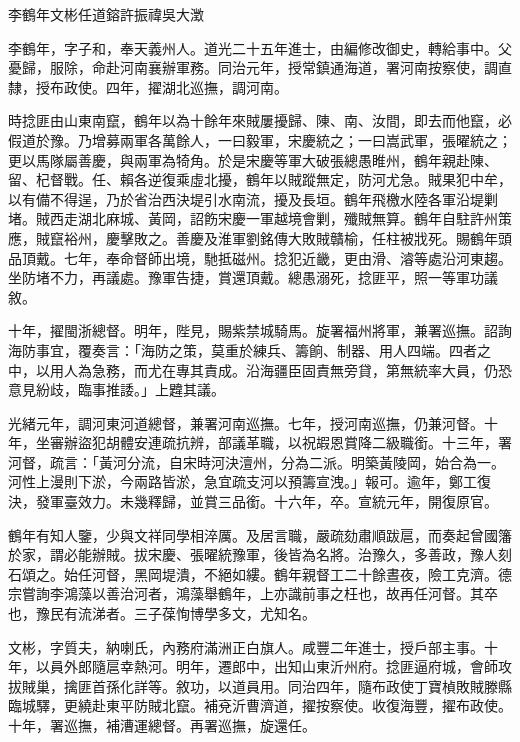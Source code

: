 
\begin{pinyinscope}
李鶴年文彬任道鎔許振禕吳大澂

李鶴年，字子和，奉天義州人。道光二十五年進士，由編修改御史，轉給事中。父憂歸，服除，命赴河南襄辦軍務。同治元年，授常鎮通海道，署河南按察使，調直隸，授布政使。四年，擢湖北巡撫，調河南。

時捻匪由山東南竄，鶴年以為十餘年來賊屢擾歸、陳、南、汝間，即去而他竄，必假道於豫。乃增募兩軍各萬餘人，一曰毅軍，宋慶統之；一曰嵩武軍，張曜統之；更以馬隊屬善慶，與兩軍為犄角。於是宋慶等軍大破張總愚睢州，鶴年親赴陳、留、杞督戰。任、賴各逆復乘虛北擾，鶴年以賊蹤無定，防河尤急。賊果犯中牟，以有備不得逞，乃於省治西決堤引水南流，擾及長垣。鶴年飛檄水陸各軍沿堤剿堵。賊西走湖北麻城、黃岡，詔飭宋慶一軍越境會剿，殲賊無算。鶴年自駐許州策應，賊竄裕州，慶擊敗之。善慶及淮軍劉銘傳大敗賊贛榆，任柱被戕死。賜鶴年頭品頂戴。七年，奉命督師出境，馳抵磁州。捻犯近畿，更由滑、濬等處沿河東趨。坐防堵不力，再議處。豫軍告捷，賞還頂戴。總愚溺死，捻匪平，照一等軍功議敘。

十年，擢閩浙總督。明年，陛見，賜紫禁城騎馬。旋署福州將軍，兼署巡撫。詔詢海防事宜，覆奏言：「海防之策，莫重於練兵、籌餉、制器、用人四端。四者之中，以用人為急務，而尤在專其責成。沿海疆臣固責無旁貸，第無統率大員，仍恐意見紛歧，臨事推諉。」上韙其議。

光緒元年，調河東河道總督，兼署河南巡撫。七年，授河南巡撫，仍兼河督。十年，坐審辦盜犯胡體安連疏抗辨，部議革職，以祝嘏恩賞降二級職銜。十三年，署河督，疏言：「黃河分流，自宋時河決澶州，分為二派。明築黃陵岡，始合為一。河性上漫則下淤，今兩路皆淤，急宜疏支河以預籌宣洩。」報可。逾年，鄭工復決，發軍臺效力。未幾釋歸，並賞三品銜。十六年，卒。宣統元年，開復原官。

鶴年有知人鑒，少與文祥同學相淬厲。及居言職，嚴疏劾肅順跋扈，而奏起曾國籓於家，謂必能辦賊。拔宋慶、張曜統豫軍，後皆為名將。治豫久，多善政，豫人刻石頌之。始任河督，黑岡堤潰，不絕如縷。鶴年親督工二十餘晝夜，險工克濟。德宗嘗詢李鴻藻以善治河者，鴻藻舉鶴年，上亦識前事之枉也，故再任河督。其卒也，豫民有流涕者。三子葆恂博學多文，尤知名。

文彬，字質夫，納喇氏，內務府滿洲正白旗人。咸豐二年進士，授戶部主事。十年，以員外郎隨扈幸熱河。明年，遷郎中，出知山東沂州府。捻匪逼府城，會師攻拔賊巢，擒匪首孫化詳等。敘功，以道員用。同治四年，隨布政使丁寶楨敗賊滕縣臨城驛，更繞赴東平防賊北竄。補兗沂曹濟道，擢按察使。收復海豐，擢布政使。十年，署巡撫，補漕運總督。再署巡撫，旋還任。


\end{pinyinscope}
